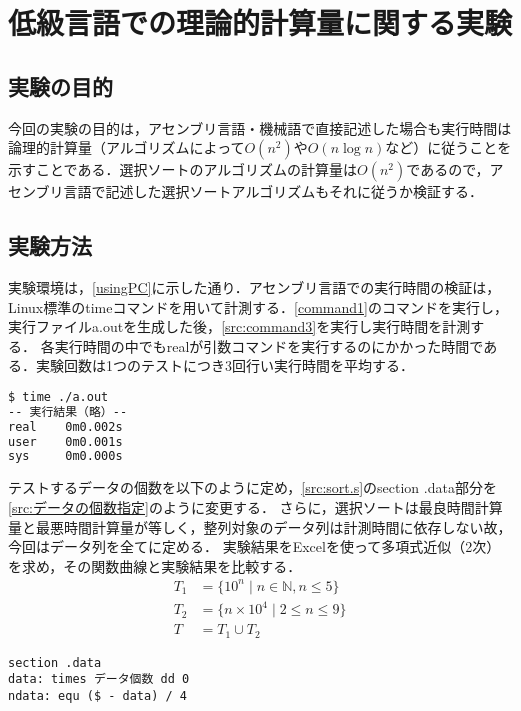 \chapter{低級言語での理論的計算量に関する実験}
\section{実験の目的}
今回の実験の目的は，アセンブリ言語・機械語で直接記述した場合も実行時間は論理的計算量（アルゴリズムによって\(O(n^2)\)や\(O(n\log n)\)など）に従うことを示すことである．選択ソートのアルゴリズムの計算量は\(O(n^2)\)である\cite[p.50,51]{アルゴリズムとデータ構造}ので，アセンブリ言語で記述した選択ソートアルゴリズムもそれに従うか検証する．
\section{実験方法}
実験環境は，\ref{usingPC}に示した通り．アセンブリ言語での実行時間の検証は，Linux標準の{\ttfamily time}コマンドを用いて計測する．\ref{command1}のコマンドを実行し，実行ファイル{\ttfamily a.out}を生成した後，\ref{src:command3}を実行し実行時間を計測する．
各実行時間の中でも{\ttfamily real}が引数コマンドを実行するのにかかった時間である．実験回数は1つのテストにつき3回行い実行時間を平均する．
\begin{lstlisting}[language={Bash},caption={実行コマンド},label={src:command3},frame={single},numbers={none}]
$ time ./a.out
-- 実行結果（略）--
real    0m0.002s
user    0m0.001s
sys     0m0.000s
\end{lstlisting}
テストするデータの個数を以下のように定め，\ref{src:sort.s}の{\ttfamily section .data}部分を\ref{src:データの個数指定}のように変更する．
さらに，選択ソートは最良時間計算量と最悪時間計算量が等しく\cite[p.50]{アルゴリズムとデータ構造}，整列対象のデータ列は計測時間に依存しない故，今回はデータ列を全て{}に定める．
実験結果をExcelを使って多項式近似（2次）を求め，その関数曲線と実験結果を比較する．
\begin{align*}
    T_1 & =\{10^n\mid n\in\mathbb{N}, n\leq 5\} \\
    T_2 & =\{n\times 10^4\mid 2\leq n\leq 9\}   \\
    T   & =T_1\cup T_2\tag*{(テストするデータ数の集合)}
\end{align*}
\begin{lstlisting}[caption={データの個数指定}, label={src:データの個数指定},frame={single},numbers={none}]
    section .data
data: times データ個数 dd 0
ndata: equ ($ - data) / 4
\end{lstlisting}

